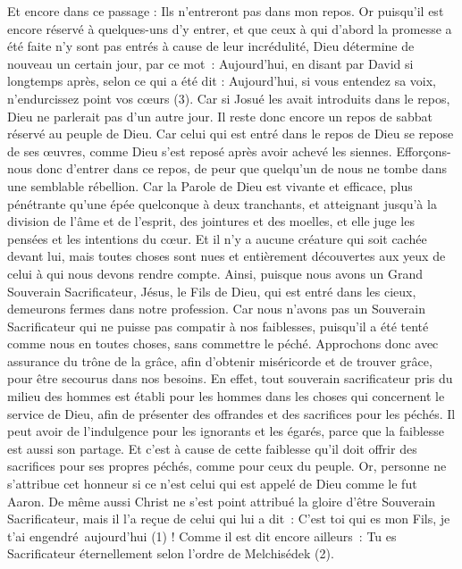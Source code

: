 \begin{multicols}{2}
Et encore dans ce passage : Ils n’entreront pas dans mon repos.
Or puisqu’il est encore réservé à quelques-uns d’y entrer, et que ceux à qui d’abord la promesse a été faite n’y sont pas entrés à cause de leur incrédulité,
Dieu détermine de nouveau un certain jour, par ce mot : Aujourd'hui, en disant par David si longtemps après, selon ce qui a été dit : Aujourd'hui, si vous entendez sa voix, n'endurcissez point vos cœurs (3).
Car si Josué les avait introduits dans le repos, Dieu ne parlerait pas d'un autre jour.
Il reste donc encore un repos de sabbat réservé au peuple de Dieu.
Car celui qui est entré dans le repos de Dieu se repose de ses œuvres, comme Dieu s’est reposé après avoir achevé les siennes.
Efforçons-nous donc d'entrer dans ce repos, de peur que quelqu'un de nous ne tombe dans une semblable rébellion.
Car la Parole de Dieu est vivante et efficace, plus pénétrante qu’une épée quelconque à deux tranchants, et atteignant jusqu’à la division de l'âme et de l'esprit, des jointures et des moelles, et elle juge les pensées et les intentions du cœur.
Et il n'y a aucune créature qui soit cachée devant lui, mais toutes choses sont nues et entièrement découvertes aux yeux de celui à qui nous devons rendre compte.
Ainsi, puisque nous avons un Grand Souverain Sacrificateur, Jésus, le Fils de Dieu, qui est entré dans les cieux, demeurons fermes dans notre profession.
Car nous n'avons pas un Souverain Sacrificateur qui ne puisse pas compatir à nos faiblesses, puisqu’il a été tenté comme nous en toutes choses, sans commettre le péché.
Approchons donc avec assurance du trône de la grâce, afin d’obtenir miséricorde et de trouver grâce, pour être secourus dans nos besoins.
\VerseOne{}En effet, tout souverain sacrificateur pris du milieu des hommes est établi pour les hommes dans les choses qui concernent le service de Dieu, afin de présenter des offrandes et des sacrifices pour les péchés.
Il peut avoir de l’indulgence pour les ignorants et les égarés, parce que la faiblesse est aussi son partage.
Et c’est à cause de cette faiblesse qu’il doit offrir des sacrifices pour ses propres péchés, comme pour ceux du peuple.
Or, personne ne s'attribue cet honneur si ce n’est celui qui est appelé de Dieu comme le fut Aaron.
De même aussi Christ ne s'est point attribué la gloire d’être Souverain Sacrificateur, mais il l’a reçue de celui qui lui a dit : C’est toi qui es mon Fils, je t'ai engendré aujourd'hui (1) !
Comme il est dit encore ailleurs : Tu es Sacrificateur éternellement selon l'ordre de Melchisédek (2).

\end{multicols}

